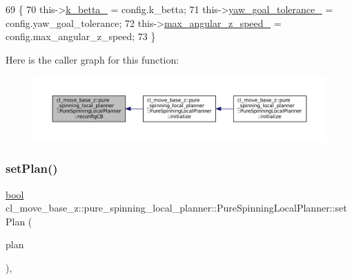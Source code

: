 \begin{DoxyCode}
69 \{
70   this->\hyperlink{classcl__move__base__z_1_1pure__spinning__local__planner_1_1PureSpinningLocalPlanner_a379d2ba057231d76edd1a661d3572d68}{k\_betta\_} = config.k\_betta;
71   this->\hyperlink{classcl__move__base__z_1_1pure__spinning__local__planner_1_1PureSpinningLocalPlanner_a07334cd7bf29f391c2553f0038fa94e8}{yaw\_goal\_tolerance\_} = config.yaw\_goal\_tolerance;
72   this->\hyperlink{classcl__move__base__z_1_1pure__spinning__local__planner_1_1PureSpinningLocalPlanner_a20edb2db356925684de4ee4fe03d5992}{max\_angular\_z\_speed\_} = config.max\_angular\_z\_speed;
73 \}
\end{DoxyCode}
Here is the caller graph for this function\+:
\nopagebreak
\begin{figure}[H]
\begin{center}
\leavevmode
\includegraphics[width=350pt]{classcl__move__base__z_1_1pure__spinning__local__planner_1_1PureSpinningLocalPlanner_a0caa25064ba8af05092feaad53e602b9_icgraph}
\end{center}
\end{figure}
\mbox{\label{classcl__move__base__z_1_1pure__spinning__local__planner_1_1PureSpinningLocalPlanner_a86a2249c0132ae9f0dc666a67d5a1f9b}} 
\subsubsection{\texorpdfstring{set\+Plan()}{setPlan()}}
{\footnotesize\ttfamily \hyperlink{classbool}{bool} cl\+\_\+move\+\_\+base\+\_\+z\+::pure\+\_\+spinning\+\_\+local\+\_\+planner\+::\+Pure\+Spinning\+Local\+Planner\+::set\+Plan (\begin{DoxyParamCaption}\item[{const std\+::vector$<$ geometry\+\_\+msgs\+::\+Pose\+Stamped $>$ \&}]{plan }\end{DoxyParamCaption})\hspace{0.3cm}{\ttfamily [override]}, {\ttfamily [virtual]}}




